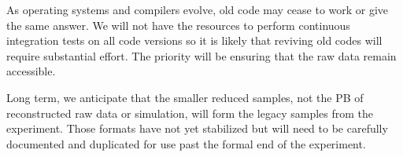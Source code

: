\documentclass[../main-v1.tex]{subfiles}
\begin{document}
As operating systems and compilers evolve, old code may cease to work or give the same answer. We will not have the resources to perform continuous integration tests on all code versions so it is likely that reviving old codes will require substantial effort. The priority will be ensuring that the raw data remain accessible. 

Long term, we anticipate that the smaller reduced samples, not the PB of reconstructed raw data or simulation, will form the legacy samples from the experiment.  Those formats have not yet stabilized but will need to be carefully documented and duplicated for use past the formal end of the experiment.



\end{document}

